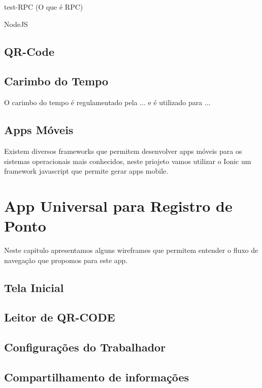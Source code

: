 \documentclass[12pt,openright,twoside,a4paper,english, brazil]{abntex2} %
\begin{document}
\begin{itemize}
test-RPC (O que é RPC)

NodeJS

\section{QR-Code}

\section{Carimbo do Tempo}

O carimbo do tempo é regulamentado pela ... e é utilizado para ...

\section{Apps Móveis}

Existem diversos frameworks que permitem desenvolver apps móveis para os sistemas operacionais mais conhecidos, neste priojeto vamos utilizar o Ionic um framework javascript que permite gerar apps mobile.

\chapter{App Universal para Registro de Ponto}


Neste capitulo apresentamos alguns wireframes que permitem entender o fluxo de navegação que propomos para este app.

\section{Tela Inicial}

\section{Leitor de QR-CODE}

\section{Configurações do Trabalhador}

\section{Compartilhamento de informações}


\end{itemize}
\end{document}
